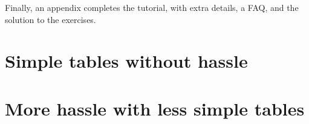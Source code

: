 \documentclass[oneside]{book}
\begin{document}
Finally, an appendix completes the tutorial, with extra details, a FAQ, and the solution to the exercises.

\tableofcontents


\part{Simple tables without hassle}




\part{More hassle with less simple tables}






\appendix
{}







\end{document}
